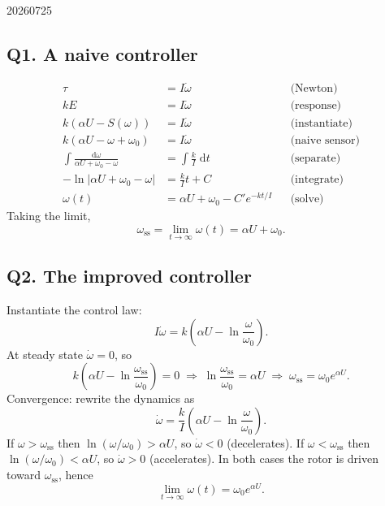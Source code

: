 \begin{solution}{20260725}

\subsection*{Q1. A naive controller}

\begin{align*}
    \tau &= I \dot \omega & &\text{(Newton)} \\
    k E &= I \dot \omega & &\text{(response)} \\
    k(\alpha U - S(\omega)) &= I \dot \omega & &\text{(instantiate)} \\
    k(\alpha U - \omega + \omega_0) &= I \dot \omega & &\text{(naive sensor)} \\
    \int \frac{\mathrm d \omega}{\alpha U + \omega_0 - \omega} &= \int \frac{k}{I}\;\mathrm d t & &\text{(separate)} \\
    -\ln|\alpha U + \omega_0 - \omega| &= \frac{k}{I}t + C & &\text{(integrate)} \\
    \omega(t) &= \alpha U + \omega_0 - C'e^{-kt/I} & &\text{(solve)}
\end{align*}
Taking the limit,
\[
    \omega_{\mathrm{ss}} = \lim_{t\to\infty}\omega(t) = \boxed{\alpha U + \omega_0}.
\]

\subsection*{Q2. The improved controller}

Instantiate the control law:
\[
    I \dot \omega = k\!\left(\alpha U - \ln\frac{\omega}{\omega_0}\right).
\]
At steady state $\dot\omega=0$, so
\[
    k\!\left(\alpha U - \ln\frac{\omega_{\mathrm{ss}}}{\omega_0}\right) = 0
    \;\Longrightarrow\;
    \ln\frac{\omega_{\mathrm{ss}}}{\omega_0} = \alpha U
    \;\Longrightarrow\;
    \omega_{\mathrm{ss}} = \omega_0 e^{\alpha U}.
\]
Convergence: rewrite the dynamics as
\[
    \dot\omega = \frac{k}{I}\!\left(\alpha U - \ln\frac{\omega}{\omega_0}\right).
\]
If $\omega>\omega_{\mathrm{ss}}$ then $\ln(\omega/\omega_0)>\alpha U$, so $\dot\omega<0$ (decelerates).  If $\omega<\omega_{\mathrm{ss}}$ then $\ln(\omega/\omega_0)<\alpha U$, so $\dot\omega>0$ (accelerates).  In both cases the rotor is driven toward $\omega_{\mathrm{ss}}$, hence
\[
    \boxed{\lim_{t\to\infty}\omega(t) = \omega_0 e^{\alpha U}}.
\]

\end{solution}


